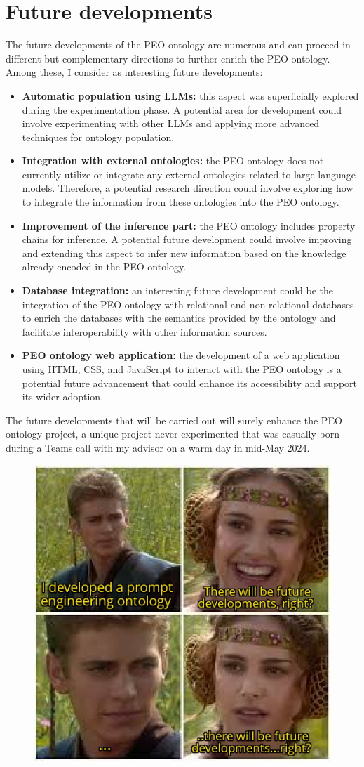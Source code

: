 \section{Future developments}
The future developments of the PEO ontology are numerous and can proceed in different but complementary directions to further enrich the PEO ontology. Among these, I consider as interesting future developments:
\begin{itemize}
    \item \textbf{Automatic population using LLMs:} this aspect was superficially explored during the experimentation phase. A potential area for development could involve experimenting with other LLMs and applying more advanced techniques for ontology population.

    \item \textbf{Integration with external ontologies:} the PEO ontology does not currently utilize or integrate any external ontologies related to large language models. Therefore, a potential research direction could involve exploring how to integrate the information from these ontologies into the PEO ontology.

    \item \textbf{Improvement of the inference part:} the PEO ontology includes property chains for inference. A potential future development could involve improving and extending this aspect to infer new information based on the knowledge already encoded in the PEO ontology.

    \item \textbf{Database integration:} an interesting future development could be the integration of the PEO ontology with relational and non-relational databases to enrich the databases with the semantics provided by the ontology and facilitate interoperability with other information sources.

    \item \textbf{PEO ontology web application:} the development of a web application using HTML, CSS, and JavaScript to interact with the PEO ontology is a potential future advancement that could enhance its accessibility and support its wider adoption. 
\end{itemize}
The future developments that will be carried out will surely enhance the PEO ontology project, a unique project never experimented that was casually born during a Teams call with my advisor on a warm day in mid-May 2024.

\begin{figure}[H]
    \centering
    \includegraphics[width=0.5\linewidth]{Figures/fig_84.jpg}
\end{figure}